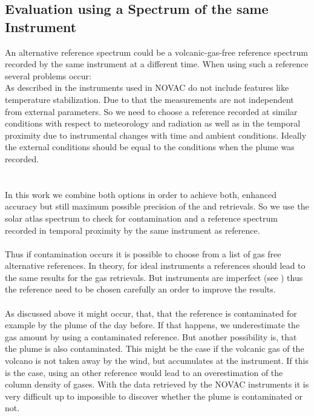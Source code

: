 \subsection*{Evaluation using a Spectrum of the same Instrument}
An alternative reference spectrum could be a volcanic-gas-free reference
spectrum recorded by the same instrument at a different time. When using such a reference several problems occur:\\
As described in  the instruments used in NOVAC do not include features like temperature stabilization. Due to that the measurements are not independent from external parameters. 
So we need to choose a reference recorded at similar conditions with respect to meteorology and	radiation as well as in the temporal proximity due to instrumental changes with time and ambient conditions. Ideally the external conditions should be equal to the conditions when the plume was recorded.\\
\\
%
\\
In this work we combine both options in order to
achieve both, enhanced accuracy but still maximum possible precision of
the  and  retrievals. So we use the solar atlas spectrum to check for 
contamination and a reference spectrum recorded in temporal proximity by the same instrument as reference.\\
\\
Thus if contamination occurs it is possible to choose from a list of gas free alternative references. In theory, for ideal instruments a references should lead to the same results for the gas retrievals. But instruments are imperfect (see ) thus the reference need to be chosen carefully an order to improve the results.\\
%
\\
As discussed above it might occur, that, that the reference is contaminated for example by the plume of the day before. If that happens, we underestimate the gas amount by using a contaminated reference. But another possibility is, that the plume is also contaminated. This might be the case if the volcanic gas of the volcano is not taken away by the wind, but accumulates at the instrument. If this is the case, using an other reference would lead to an overestimation of the column density of gases. With the data retrieved by the NOVAC instruments it is very difficult up to impossible to discover whether the plume is contaminated or not. \\
\\
